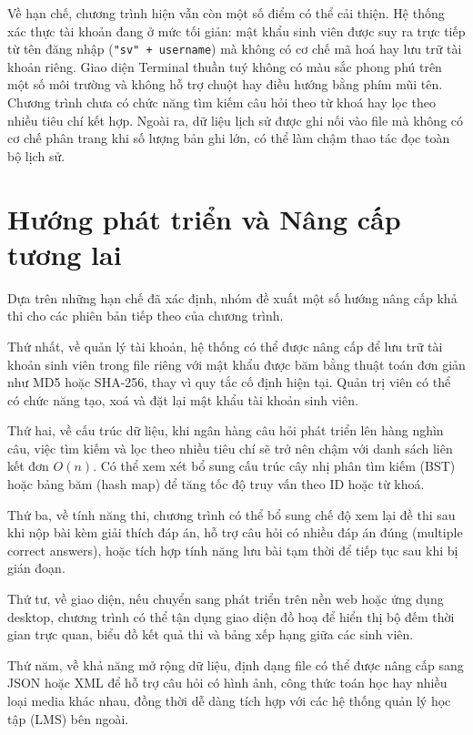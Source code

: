 \documentclass[11pt]{report}
\begin{document}
Về hạn chế, chương trình hiện vẫn còn một số điểm có thể cải thiện. Hệ thống xác thực tài khoản đang ở mức tối giản: mật khẩu sinh viên được suy ra trực tiếp từ tên đăng nhập (\texttt{"sv" + username}) mà không có cơ chế mã hoá hay lưu trữ tài khoản riêng. Giao diện Terminal thuần tuý không có màu sắc phong phú trên một số môi trường và không hỗ trợ chuột hay điều hướng bằng phím mũi tên. Chương trình chưa có chức năng tìm kiếm câu hỏi theo từ khoá hay lọc theo nhiều tiêu chí kết hợp. Ngoài ra, dữ liệu lịch sử được ghi nối vào file mà không có cơ chế phân trang khi số lượng bản ghi lớn, có thể làm chậm thao tác đọc toàn bộ lịch sử.

\section{Hướng phát triển và Nâng cấp tương lai}

Dựa trên những hạn chế đã xác định, nhóm đề xuất một số hướng nâng cấp khả thi cho các phiên bản tiếp theo của chương trình.

Thứ nhất, về quản lý tài khoản, hệ thống có thể được nâng cấp để lưu trữ tài khoản sinh viên trong file riêng với mật khẩu được băm bằng thuật toán đơn giản như MD5 hoặc SHA-256, thay vì quy tắc cố định hiện tại. Quản trị viên có thể có chức năng tạo, xoá và đặt lại mật khẩu tài khoản sinh viên.

Thứ hai, về cấu trúc dữ liệu, khi ngân hàng câu hỏi phát triển lên hàng nghìn câu, việc tìm kiếm và lọc theo nhiều tiêu chí sẽ trở nên chậm với danh sách liên kết đơn $O(n)$. Có thể xem xét bổ sung cấu trúc cây nhị phân tìm kiếm (BST) hoặc bảng băm (hash map) để tăng tốc độ truy vấn theo ID hoặc từ khoá.

Thứ ba, về tính năng thi, chương trình có thể bổ sung chế độ xem lại đề thi sau khi nộp bài kèm giải thích đáp án, hỗ trợ câu hỏi có nhiều đáp án đúng (multiple correct answers), hoặc tích hợp tính năng lưu bài tạm thời để tiếp tục sau khi bị gián đoạn.

Thứ tư, về giao diện, nếu chuyển sang phát triển trên nền web hoặc ứng dụng desktop, chương trình có thể tận dụng giao diện đồ hoạ để hiển thị bộ đếm thời gian trực quan, biểu đồ kết quả thi và bảng xếp hạng giữa các sinh viên.

Thứ năm, về khả năng mở rộng dữ liệu, định dạng file có thể được nâng cấp sang JSON hoặc XML để hỗ trợ câu hỏi có hình ảnh, công thức toán học hay nhiều loại media khác nhau, đồng thời dễ dàng tích hợp với các hệ thống quản lý học tập (LMS) bên ngoài.
\end{document}
